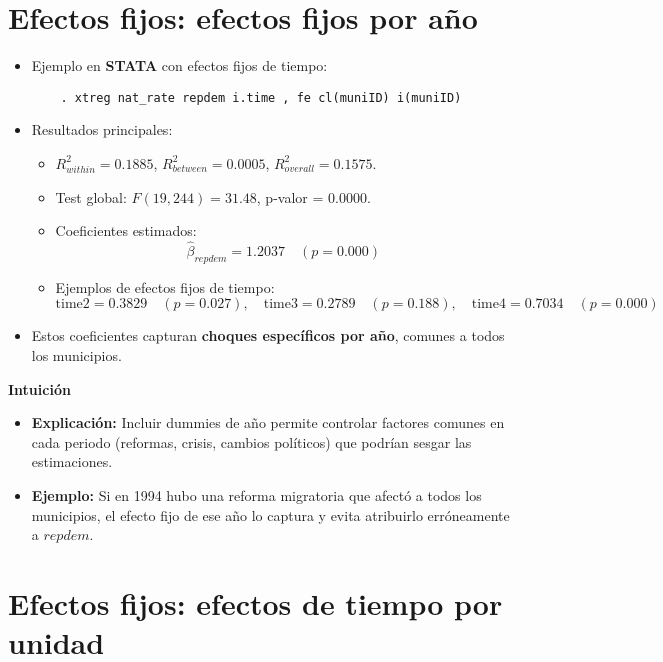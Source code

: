 \documentclass[12pt]{article}
\begin{document}
\section*{\noindent\textbf{Efectos fijos: efectos fijos por año}}

\begin{itemize}
    \item Ejemplo en \textbf{STATA} con efectos fijos de tiempo:
    \begin{verbatim}
    . xtreg nat_rate repdem i.time , fe cl(muniID) i(muniID)
    \end{verbatim}
    
    \item Resultados principales:
    \begin{itemize}
        \item $R^2_{within} = 0.1885$, $R^2_{between} = 0.0005$, $R^2_{overall} = 0.1575$.
        \item Test global: $F(19,244) = 31.48$, p-valor = 0.0000.
        \item Coeficientes estimados:
        \[
        \hat{\beta}_{repdem} = 1.2037 \quad (p = 0.000)
        \]
        \item Ejemplos de efectos fijos de tiempo:
        \[
        \text{time2} = 0.3829 \quad (p = 0.027), \quad
        \text{time3} = 0.2789 \quad (p = 0.188), \quad
        \text{time4} = 0.7034 \quad (p = 0.000)
        \]
    \end{itemize}
    
    \item Estos coeficientes capturan \textbf{choques específicos por año}, comunes a todos los municipios.
\end{itemize}

\noindent\textbf{Intuición}
\begin{itemize}
    \item \textbf{Explicación:} Incluir dummies de año permite controlar factores comunes en cada periodo (reformas, crisis, cambios políticos) que podrían sesgar las estimaciones.
    \item \textbf{Ejemplo:} Si en 1994 hubo una reforma migratoria que afectó a todos los municipios, el efecto fijo de ese año lo captura y evita atribuirlo erróneamente a $repdem$.
\end{itemize}

\section*{\noindent\textbf{Efectos fijos: efectos de tiempo por unidad}}
\end{document}
